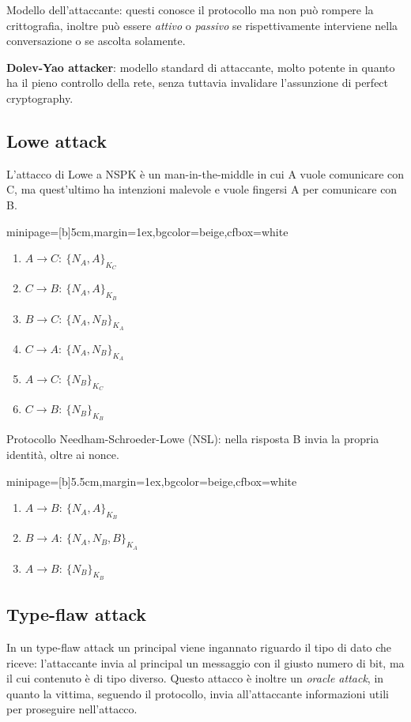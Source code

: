\documentclass[a4paper, 11pt, notitlepage, fleqn]{report}
\newcommand{\fromto}[2]{#1\rightarrow #2\!:\ }
\newenvironment{colbox}[2]%
{%
	\par\noindent\hspace{10pt}
	\begin{adjustbox}{minipage=[b]{#2},margin=1ex,bgcolor=#1,cfbox=white}
}{%
	\end{adjustbox}\newline%
}
\begin{document}
\noindent
Modello dell'attaccante: questi conosce il protocollo ma non può rompere la crittografia, inoltre può essere \emph{attivo} o \emph{passivo} se rispettivamente interviene nella conversazione o se ascolta solamente.

\textbf{Dolev-Yao attacker}: modello standard di attaccante, molto potente in quanto ha il pieno controllo della rete, senza tuttavia invalidare l'assunzione di perfect cryptography.

\subsection{Lowe attack}
L'attacco di Lowe a NSPK è un man-in-the-middle in cui A vuole comunicare con C, ma quest'ultimo ha intenzioni malevole e vuole fingersi A per comunicare con B.
\begin{colbox}{beige}{5cm}
	\begin{enumerate}
		\item $\fromto{A}{C}\{N_A,A\}_{K_C}$
		\item $\fromto{C}{B}\{N_A,A\}_{K_B}$
		\item $\fromto{B}{C}\{N_A,N_B\}_{K_A}$
		\item $\fromto{C}{A}\{N_A,N_B\}_{K_A}$
		\item $\fromto{A}{C}\{N_B\}_{K_C}$
		\item $\fromto{C}{B}\{N_B\}_{K_B}$
	\end{enumerate}
\end{colbox}
Protocollo Needham-Schroeder-Lowe (NSL): nella risposta B invia la propria identità, oltre ai nonce.
\begin{colbox}{beige}{5.5cm}
	\begin{enumerate}
		\item $\fromto{A}{B}\{N_A,A\}_{K_B}$
		\item $\fromto{B}{A}\{N_A,N_B,B\}_{K_A}$
		\item $\fromto{A}{B}\{N_B\}_{K_B}$
	\end{enumerate}
\end{colbox}

\subsection{Type-flaw attack}
In un type-flaw attack un principal viene ingannato riguardo il tipo di dato che riceve: l'attaccante invia al principal un messaggio con il giusto numero di bit, ma il cui contenuto è di tipo diverso. Questo attacco è inoltre un \emph{oracle attack}, in quanto la vittima, seguendo il protocollo, invia all'attaccante informazioni utili per proseguire nell'attacco.
\end{document}
